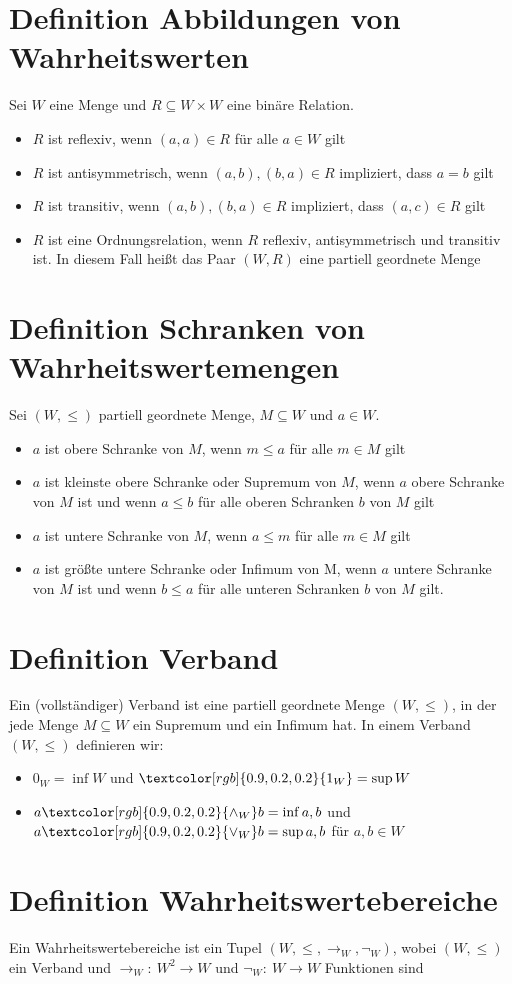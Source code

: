 \documentclass[12pt,a4paper]{report}
\newcommand{\ra}{\rightarrow}
\newcommand{\ls}{\newline\newline}
\newcommand{\define}[1]{\section{\blue{Definition #1}}}
\newcommand{\red}[1]{\textcolor[rgb]{0.9,0.2,0.2}{#1}}
\newcommand{\blue}[1]{\textcolor[rgb]{0.2,0.2,1}{#1}}
\begin{document}
\define{Abbildungen von Wahrheitswerten}
Sei $ W $ eine Menge und $ R \subseteq W \times W $ eine binäre Relation.
\begin{itemize}
    \item $ R $ ist \red{reflexiv}, wenn $ (a,a) \in R $ für alle $ a \in W $ gilt
    \item $ R $ ist \red{antisymmetrisch}, wenn $ (a,b),(b,a) \in R $ impliziert, dass $ a = b $ gilt
    \item $ R $ ist \red{transitiv}, wenn $ (a,b),(b,a) \in R $ impliziert, dass $ (a,c) \in R $ gilt
    \item $ R $ ist eine \red{Ordnungsrelation}, wenn $ R $ reflexiv, antisymmetrisch und transitiv ist. In diesem Fall heißt das Paar $ (W,R) $ eine \red{partiell geordnete Menge}
\end{itemize}
\define{Schranken von Wahrheitswertemengen}
Sei $ (W, \leq) $ partiell geordnete Menge, $ M \subseteq W $ und $ a \in W $.
\begin{itemize}
    \item $ a $ ist \red{obere Schranke von $ M $}, wenn $ m \leq a $ für alle $ m \in M $ gilt
    \item $ a $ ist \red{kleinste obere Schranke} oder \red{Supremum von $ M $}, wenn $ a $ obere Schranke von $ M $ ist und wenn $ a \leq b $ für alle oberen Schranken $ b $ von $ M $ gilt
    \item $ a $ ist \red{untere Schranke von $ M $}, wenn $ a \leq m $ für alle $ m \in M $ gilt
    \item $ a $ ist \red{größte untere Schranke} oder \red{Infimum von M}, wenn $ a $ untere Schranke von $ M $ ist und wenn $ b \leq a  $ für alle unteren Schranken $ b $ von $ M $ gilt.
\end{itemize}
\define{Verband}
Ein \red{(vollständiger) Verband} ist eine partiell geordnete Menge $ (W, \leq) $, in der jede Menge $ M \subseteq W $ ein Supremum und ein Infimum hat.\ls
In einem Verband $ (W,\leq) $ definieren wir:
\begin{itemize}
    \item \red{$ 0_W $}$ = \inf W $ und $ \red{1_W} = \sup W $
    \item $ a \red{\wedge_W} b = \inf{a,b} $ und $ a \red{\vee_W} b = \sup{a,b} $ für $ a,b \in W $
\end{itemize}
\define{Wahrheitswertebereiche}
Ein \red{Wahrheitswertebereiche} ist ein Tupel $ (W, \leq, \ra_W, \lnot_W) $, wobei $ (W, \leq) $ ein Verband und $ \ra_W:~ W^2 \ra W $ und $ \lnot_W:~ W \ra W $ Funktionen sind
\end{document}
